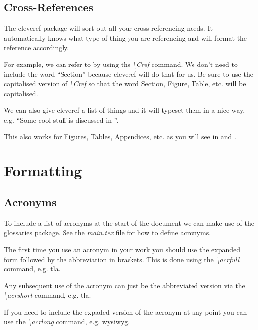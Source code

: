 \documentclass{BCUDissertation}
\begin{document}
\begin{appendices}

    \subsection{Cross-References}
    \label{sec:CrossReferences}
        The cleveref package will sort out all your cross-referencing needs. It automatically knows what type of thing you are referencing and will format the reference accordingly.
    
        For example, we can refer to  by using the \textit{\textbackslash Cref} command. We don't need to include the word ``Section'' because cleveref will do that for us. Be sure to use the capitalised version of \textit{\textbackslash Cref} so that the word Section, Figure, Table, etc. will be capitalised.
    
        We can also give cleveref a list of things and it will typeset them in a nice way, e.g. ``Some cool stuff is discussed in ''.
    
        This also works for Figures, Tables, Appendices, etc. as you will see in  and .
        
\section{Formatting}
\label{sec:Formatting}

    \subsection{Acronyms}
        To include a list of acronyms at the start of the document we can make use of the glossaries package. See the \textit{main.tex} file for how to define acronyms.
    
        The first time you use an acronym in your work you should use the expanded form followed by the abbreviation in brackets. This is done using the \textit{\textbackslash acrfull} command, e.g. \acrfull{tla}.
    
        Any subsequent use of the acronym can just be the abbreviated version via the \textit{\textbackslash acrshort} command, e.g. \acrshort{tla}.
    
        If you need to include the expaded version of the acronym at any point you can use the \textit{\textbackslash acrlong} command, e.g. \acrlong{wysiwyg}.
    

\end{appendices}
\end{document}
